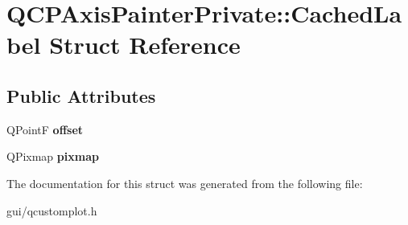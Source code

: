 \hypertarget{structQCPAxisPainterPrivate_1_1CachedLabel}{}\section{Q\+C\+P\+Axis\+Painter\+Private\+:\+:Cached\+Label Struct Reference}
\label{structQCPAxisPainterPrivate_1_1CachedLabel}
\subsection*{Public Attributes}
\begin{DoxyCompactItemize}
\item 
\mbox{\label{structQCPAxisPainterPrivate_1_1CachedLabel_a5f502db71c92e572f1e6f44f62c59d8e}} 
Q\+PointF {\bfseries offset}
\item 
\mbox{\label{structQCPAxisPainterPrivate_1_1CachedLabel_a461597cbd470914a9d24b64d16037a88}} 
Q\+Pixmap {\bfseries pixmap}
\end{DoxyCompactItemize}


The documentation for this struct was generated from the following file\+:\begin{DoxyCompactItemize}
\item 
gui/qcustomplot.\+h\end{DoxyCompactItemize}
